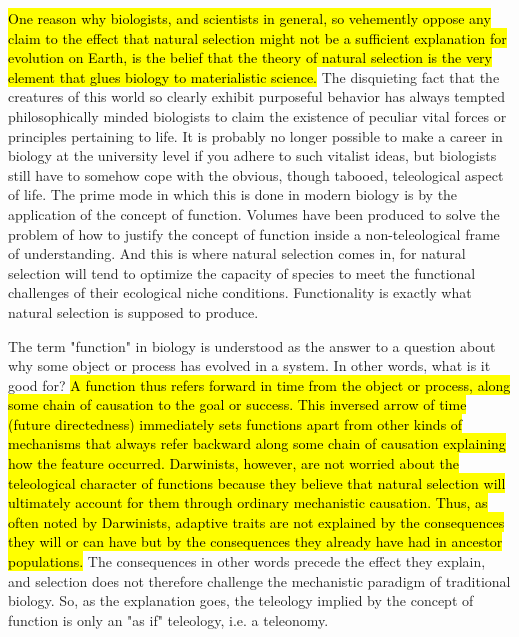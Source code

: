 \documentclass{ut-thesis}
\begin{document}
\begin{longquote}
\hl{One reason why biologists, and scientists in general, so vehemently oppose any claim 
to the effect that natural selection might not be a sufficient explanation for evolution 
on Earth, is the belief that the theory of natural selection is the very element that glues 
biology to materialistic science.} The disquieting fact that the creatures of this world so 
clearly exhibit purposeful behavior has always tempted philosophically minded 
biologists to claim the existence of peculiar vital forces or principles pertaining to life. 
It is probably no longer possible to make a career in biology at the university level if 
you adhere to such vitalist ideas, but biologists still have to somehow cope with the 
obvious, though tabooed, teleological aspect of life. The prime mode in which this is 
done in modern biology is by the application of the concept of function.
 Volumes have been produced to solve the problem of how to justify the concept of function 
inside a non-teleological frame of understanding. And this is where natural selection 
comes in, for natural selection will tend to optimize the capacity of species to meet the 
functional challenges of their ecological niche conditions. Functionality is exactly 
what natural selection is supposed to produce.

The term "function" in biology is understood as the answer to a question about 
why some object or process has evolved in a system. In other words, what is it good 
for? \hl{A function thus refers forward in time from the object or process, along some 
chain of causation to the goal or success. This inversed arrow of time (future 
directedness) immediately sets functions apart from other kinds of mechanisms that 
always refer backward along some chain of causation explaining how the feature 
occurred. Darwinists, however, are not worried about the teleological character of 
functions because they believe that natural selection will ultimately account for them 
through ordinary mechanistic causation. Thus, as often noted by Darwinists, adaptive 
traits are not explained by the consequences they will or can have but by the 
consequences they already have had in ancestor populations.}
 The consequences in other words precede the effect they explain, and selection does not therefore challenge 
the mechanistic paradigm of traditional biology. So, as the explanation goes, the 
teleology implied by the concept of function is only an "as if" teleology, i.e. a 
teleonomy.


\end{longquote}
\end{document}
